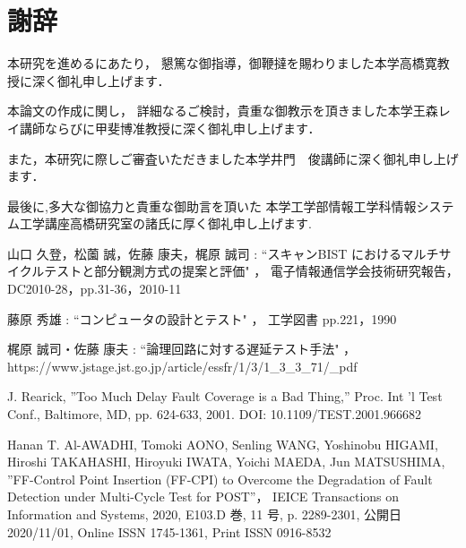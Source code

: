 \newpage
{}
\chapter*{謝辞}
本研究を進めるにあたり，
懇篤な御指導，御鞭撻を賜わりました本学高橋寛教授に深く御礼申し上げます．

本論文の作成に関し，
詳細なるご検討，貴重な御教示を頂きました本学王森レイ講師ならびに甲斐博准教授に深く御礼申し上げます．

また，本研究に際しご審査いただきました本学井門　俊講師に深く御礼申し上げます．

最後に,多大な御協力と貴重な御助言を頂いた
本学工学部情報工学科情報システム工学講座高橋研究室の諸氏に厚く御礼申し上げます.


\begin{thebibliography}{99}


山口 久登，松薗 誠，佐藤 康夫，梶原 誠司 : 
“スキャンBIST におけるマルチサイクルテストと部分観測方式の提案と評価" ，
電子情報通信学会技術研究報告，DC2010-28，pp.31-36，2010-11 

藤原 秀雄 : 
“コンピュータの設計とテスト" ，
工学図書 pp.221，1990

梶原 誠司・佐藤 康夫 : 
“論理回路に対する遅延テスト手法" ，
https://www.jstage.jst.go.jp/article/essfr/1/3/1\_3\_3\_71/\_pdf

J. Rearick, ”Too Much Delay Fault Coverage is a Bad Thing,” Proc. Int ’l Test
Conf., Baltimore, MD, pp. 624-633, 2001. DOI: 10.1109/TEST.2001.966682

Hanan T. Al-AWADHI, Tomoki AONO, Senling WANG, Yoshinobu HIGAMI, 
Hiroshi TAKAHASHI, Hiroyuki IWATA, Yoichi MAEDA, Jun MATSUSHIMA, 
”FF-Control Point Insertion (FF-CPI) to Overcome the Degradation of Fault Detection under Multi-Cycle Test for POST”，
IEICE Transactions on Information and Systems, 2020, E103.D 巻, 11 号, p. 2289-2301, 
公開日 2020/11/01, Online ISSN 1745-1361, Print ISSN 0916-8532


\end{thebibliography}


